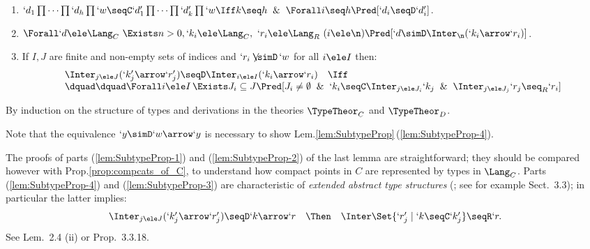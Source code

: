 \documentclass{lmcs}
\begin{document}
 \begin{lem} \label{lem:SubtypeProp}

 \begin{enumerate}

 \firstitem \label{lem:SubtypeProp-1}
$\Forall `k \ele \Lang_C \ \Exists `d_i \ele \Lang_D ~ (i \ele \n) \Pred[ `k \simC `d_1\prod \cdots\prod `d_n\prod `w ] $.

 \item \label{lem:SubtypeProp-2}
$`d_1\prod \cdots\prod `d_h\prod `w \seqC `d'_1\prod \cdots\prod `d'_k\prod `w \Iff k \seq h \And \Forall i \seq h \Pred [ `d_i \seqD `d'_i ] $.

 \item \label{lem:SubtypeProp-4}
$\Forall `d \ele \Lang_C \ \Exists n>0,`k_i \ele \Lang_C ,\ `r_i \ele \Lang_R ~ (i \ele \n) \Pred[ `d \simD \Inter_{\n} (`k _i\arrow `r_i) ] $.

 \item \label{lem:SubtypeProp-3}
If $I,J$ are finite and non-empty sets of indices and $`r_i\not\!\!\simD \,`w $ for all $i \ele I$ then:
%
 \[ \begin{array}{rcl}
 \Inter_{j \ele J} (`k '_j\arrow `r'_j) \seqD \Inter_{i \ele I} (`k _i\arrow `r_i) 
	&\Iff& \\
\multicolumn{3}{l}{\dquad\dquad
 \Forall i \ele I \, \Exists J_i\subseteq J \Pred[ J_i \neq\emptyset \And `k _i\seqC \Inter_{j \ele J_i}`k _j \And \Inter_{j \ele J_j}`r_j \seq_R `r_i ]}
 \end{array} \]

 \end{enumerate}
 \end{lem}

 \begin{Proof} By induction on the structure of types and derivations in the theories $\TypeTheor_C$ and $\TypeTheor_D$. 
 \end{Proof}

\noindent
Note that the equivalence $`y \simD `w\arrow `y$ is necessary to show Lem.\skp\ref{lem:SubtypeProp}\,(\ref{lem:SubtypeProp-4}). 

The proofs of parts (\ref{lem:SubtypeProp-1}) and (\ref{lem:SubtypeProp-2}) of the last lemma are straightforward; they should be compared however with Prop.\skp\ref{prop:compcats_of_C}, to understand how compact points in $C$ are represented by types in $\Lang_C$.
Parts (\ref{lem:SubtypeProp-4}) and (\ref{lem:SubtypeProp-3}) are characteristic of \emph{extended abstract type structures} (\EATS; see for example \cite{Amadio-Curien'98} Sect.~3.3); in particular the latter implies:
%
 \[ \begin{array}{rcl}
\Inter_{j \ele J} (`k '_j\arrow `r'_j) \seqD `k\arrow `r 
	&\Then& 
\Inter\Set{`r'_j\mid `k\seqC `k'_j} \seqR `r.
 \end{array} \]
See \cite{BCD'83} Lem.~2.4 (ii) or \cite{Amadio-Curien'98} Prop.~3.3.18.
\end{document}

